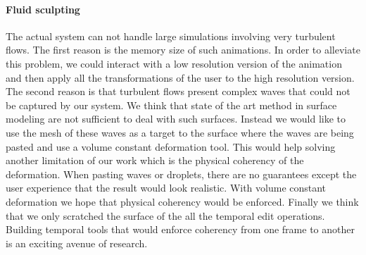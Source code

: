 \paragraph{Fluid sculpting} The actual system can not handle large simulations involving very turbulent flows. The first reason is the memory size of such animations. In order to alleviate this problem, we could interact with a low resolution version of the animation and then apply all the transformations of the user to the high resolution version. The second reason is that turbulent flows present complex waves that could not be captured by our system. We think that state of the art method in surface modeling are not sufficient to deal with such surfaces. Instead we would like to use the mesh of these waves as a target to the surface where the waves are being pasted and use a volume constant deformation tool. This would help solving another limitation of our work which is the physical coherency of the deformation. When pasting waves or droplets, there are no guarantees except the user experience that the result would look realistic. With volume constant deformation we hope that physical coherency would be enforced. Finally we think that we only scratched the surface of the all the temporal edit operations. Building temporal tools that would enforce coherency from one frame to another is an exciting avenue of research.
